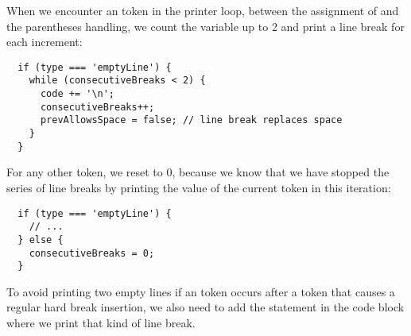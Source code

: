 When we encounter an  token in the printer loop,
between the assignment of 
and the parentheses handling,
we count the variable  up to 2
and print a line break for each increment:
\begin{verbatim}
  if (type === 'emptyLine') {
    while (consecutiveBreaks < 2) {
      code += '\n';
      consecutiveBreaks++;
      prevAllowsSpace = false; // line break replaces space
    }
  }
\end{verbatim}
For any other token,
we reset  to 0,
because we know that we have stopped the series of line breaks
by printing the value of the current token in this iteration:
\begin{verbatim}
  if (type === 'emptyLine') {
    // ...
  } else {
    consecutiveBreaks = 0;
  }
\end{verbatim}

To avoid printing two empty lines if an  token
occurs after a  token
that causes a regular hard break insertion,
we also need to add the statement 
in the code block where we print that kind of line break.
